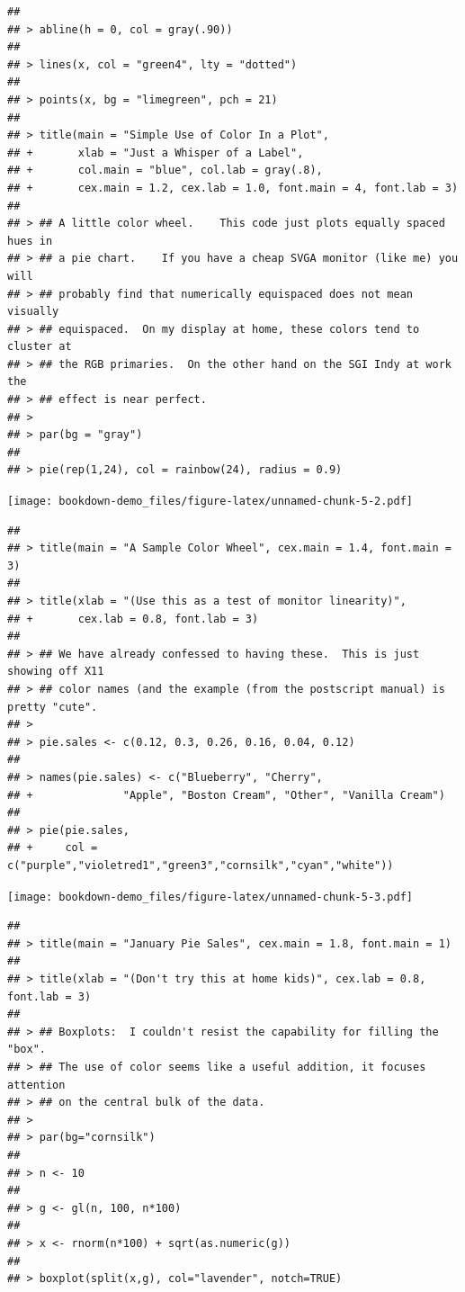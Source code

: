 \documentclass[
]{book}
\begin{document}
\begin{verbatim}
## 
## > abline(h = 0, col = gray(.90))
## 
## > lines(x, col = "green4", lty = "dotted")
## 
## > points(x, bg = "limegreen", pch = 21)
## 
## > title(main = "Simple Use of Color In a Plot",
## +       xlab = "Just a Whisper of a Label",
## +       col.main = "blue", col.lab = gray(.8),
## +       cex.main = 1.2, cex.lab = 1.0, font.main = 4, font.lab = 3)
## 
## > ## A little color wheel.    This code just plots equally spaced hues in
## > ## a pie chart.    If you have a cheap SVGA monitor (like me) you will
## > ## probably find that numerically equispaced does not mean visually
## > ## equispaced.  On my display at home, these colors tend to cluster at
## > ## the RGB primaries.  On the other hand on the SGI Indy at work the
## > ## effect is near perfect.
## > 
## > par(bg = "gray")
## 
## > pie(rep(1,24), col = rainbow(24), radius = 0.9)
\end{verbatim}

\texttt{[image: bookdown-demo\_files/figure-latex/unnamed-chunk-5-2.pdf]}

\begin{verbatim}
## 
## > title(main = "A Sample Color Wheel", cex.main = 1.4, font.main = 3)
## 
## > title(xlab = "(Use this as a test of monitor linearity)",
## +       cex.lab = 0.8, font.lab = 3)
## 
## > ## We have already confessed to having these.  This is just showing off X11
## > ## color names (and the example (from the postscript manual) is pretty "cute".
## > 
## > pie.sales <- c(0.12, 0.3, 0.26, 0.16, 0.04, 0.12)
## 
## > names(pie.sales) <- c("Blueberry", "Cherry",
## +              "Apple", "Boston Cream", "Other", "Vanilla Cream")
## 
## > pie(pie.sales,
## +     col = c("purple","violetred1","green3","cornsilk","cyan","white"))
\end{verbatim}

\texttt{[image: bookdown-demo\_files/figure-latex/unnamed-chunk-5-3.pdf]}

\begin{verbatim}
## 
## > title(main = "January Pie Sales", cex.main = 1.8, font.main = 1)
## 
## > title(xlab = "(Don't try this at home kids)", cex.lab = 0.8, font.lab = 3)
## 
## > ## Boxplots:  I couldn't resist the capability for filling the "box".
## > ## The use of color seems like a useful addition, it focuses attention
## > ## on the central bulk of the data.
## > 
## > par(bg="cornsilk")
## 
## > n <- 10
## 
## > g <- gl(n, 100, n*100)
## 
## > x <- rnorm(n*100) + sqrt(as.numeric(g))
## 
## > boxplot(split(x,g), col="lavender", notch=TRUE)
\end{verbatim}
\end{document}
